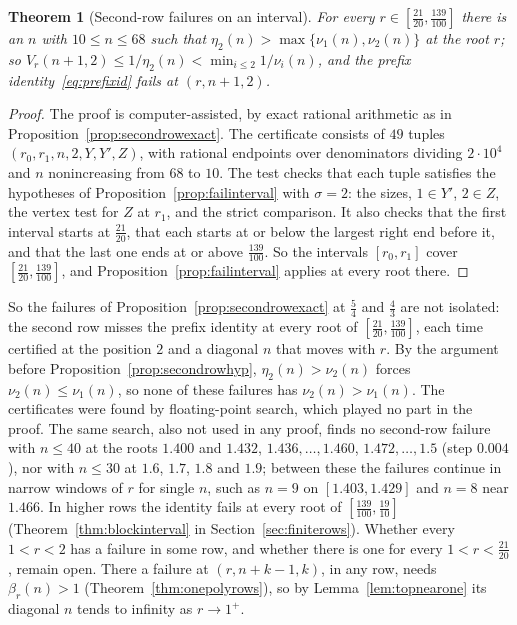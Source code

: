 \documentclass[11pt]{article}
\newtheorem{theorem}{Theorem}[section]
\begin{document}
\begin{theorem}[Second-row failures on an interval]\label{thm:failinterval}
For every $r\in[\frac{21}{20},\frac{139}{100}]$ there is an $n$ with
$10\le n\le68$ such that $\eta_2(n)>\max\{\nu_1(n),\nu_2(n)\}$ at the root
$r$; so $V_r(n+1,2)\le1/\eta_2(n)<\min_{i\le2}1/\nu_i(n)$, and the prefix
identity~\eqref{eq:prefixid} fails at $(r,n+1,2)$.
\end{theorem}

\begin{proof}
The proof is computer-assisted, by exact rational arithmetic as in
Proposition~\ref{prop:secondrowexact}.  The certificate consists of
$49$ tuples $(r_0,r_1,n,2,Y,Y',Z)$, with rational endpoints over
denominators dividing $2\cdot10^4$ and $n$ nonincreasing from $68$ to $10$.  The
test checks that each tuple satisfies the hypotheses of
Proposition~\ref{prop:failinterval} with $\sigma=2$: the sizes, $1\in Y'$,
$2\in Z$, the vertex test for $Z$ at $r_1$, and the strict comparison.  It
also checks that the first interval starts at $\frac{21}{20}$, that each
starts at or below the largest right end before it, and that the last one
ends at or above $\frac{139}{100}$.  So the intervals $[r_0,r_1]$ cover
$[\frac{21}{20},\frac{139}{100}]$, and Proposition~\ref{prop:failinterval}
applies at every root there.
\end{proof}

So the failures of Proposition~\ref{prop:secondrowexact} at $\frac54$ and
$\frac43$ are not isolated: the second row misses the prefix identity at
every root of $[\frac{21}{20},\frac{139}{100}]$, each time certified at the
position $2$ and a diagonal $n$ that moves with $r$.  By the argument before
Proposition~\ref{prop:secondrowhyp}, $\eta_2(n)>\nu_2(n)$ forces
$\nu_2(n)\le\nu_1(n)$, so none of these failures has
$\nu_2(n)>\nu_1(n)$.  The certificates were found by
floating-point search, which played no part in the proof.  The same
search, also not used in any proof, finds no second-row failure with
$n\le40$ at the roots $1.400$ and $1.432$, $1.436,\ldots,1.460$,
$1.472,\ldots,1.5$ (step $0.004$), nor with $n\le30$ at $1.6$, $1.7$,
$1.8$ and $1.9$; between these the failures continue in narrow windows
of $r$ for single $n$, such as $n=9$ on $[1.403,1.429]$ and $n=8$ near
$1.466$.  In higher rows the identity fails at every root of
$[\frac{139}{100},\frac{19}{10}]$ (Theorem~\ref{thm:blockinterval} in
Section~\ref{sec:finiterows}).  Whether every $1<r<2$ has a failure in some
row, and whether there is one for every $1<r<\frac{21}{20}$, remain open.
There a failure at $(r,n+k-1,k)$, in any row, needs $\beta_r(n)>1$
(Theorem~\ref{thm:onepolyrows}), so by Lemma~\ref{lem:topnearone} its
diagonal $n$ tends to infinity as $r\to1^+$.
\end{document}
